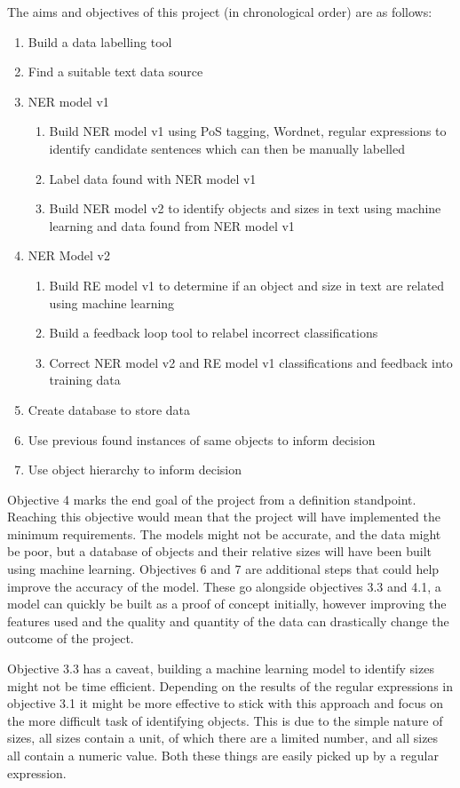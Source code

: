 \documentclass[11pt,oneside]{book}
\begin{document}
The aims and objectives of this project (in chronological order) are as follows:

\begin{enumerate}
\item Build a data labelling tool
\item Find a suitable text data source
\item NER model v1
\begin{enumerate}
\item Build NER model v1 using PoS tagging, Wordnet, regular expressions to identify candidate sentences which can then be manually labelled
\item Label data found with NER model v1
\item Build NER model v2 to identify objects and sizes in text using machine learning and data found from NER model v1
\end{enumerate}
\item NER Model v2
\begin{enumerate}
\item Build RE model v1 to determine if an object and size in text are related using machine learning
\item Build a feedback loop tool to relabel incorrect classifications
\item Correct NER model v2 and RE model v1 classifications and feedback into training data
\end{enumerate}
\item Create database to store data
\item Use previous found instances of same objects to inform decision
\item Use object hierarchy to inform decision
\end{enumerate}

Objective 4 marks the end goal of the project from a definition standpoint. Reaching this objective would mean that the project will have implemented the minimum requirements. The models might not be accurate, and the data might be poor, but a database of objects and their relative sizes will have been built using machine learning. Objectives 6 and 7 are additional steps that could help improve the accuracy of the model. These go alongside objectives 3.3 and 4.1, a model can quickly be built as a proof of concept initially, however improving the features used and the quality and quantity of the data can drastically change the outcome of the project.

Objective 3.3 has a caveat, building a machine learning model to identify sizes might not be time efficient. Depending on the results of the regular expressions in objective 3.1 it might be more effective to stick with this approach and focus on the more difficult task of identifying objects. This is due to the simple nature of sizes, all sizes contain a unit, of which there are a limited number, and all sizes all contain a numeric value. Both these things are easily picked up by a regular expression.
\end{document}

